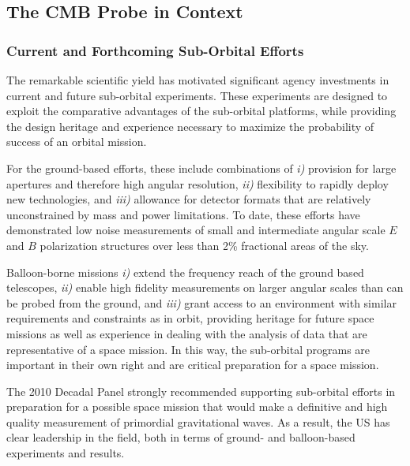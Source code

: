 
\subsection{The CMB Probe in Context}
\label{sec:spacemission}

\vspace{-0.05in}

\subsubsection{Current and Forthcoming Sub-Orbital Efforts}

The remarkable scientific yield has motivated significant agency investments 
in current and future sub-orbital experiments. 
These experiments are designed 
to exploit the comparative advantages of the sub-orbital platforms, while providing the design heritage and 
experience necessary to maximize the probability of success of an orbital mission. 

For the ground-based efforts, these include combinations of {\it i)}
provision for large apertures and therefore high angular
resolution, {\it ii)} flexibility to rapidly deploy new technologies, and {\it iii)}
allowance for detector formats that are relatively unconstrained by
mass and power limitations.  To date, these efforts have demonstrated low
noise measurements of small and intermediate angular scale $E$ and $B$ polarization 
structures over less than 2\% fractional areas of the sky. 

Balloon-borne missions {\it i)} extend the frequency reach of the ground based telescopes, 
{\it ii)} enable high fidelity measurements on larger angular scales than can be probed from the 
ground, and {\it iii)} grant access to an environment with similar requirements and constraints
as in orbit, providing heritage for future space missions as well as experience in dealing with the 
analysis of data that are representative of a space mission. In this way, the sub-orbital programs are 
important in their own right and are critical preparation for a space mission.

The 2010 Decadal Panel strongly recommended supporting sub-orbital efforts in preparation 
for a possible space mission that would make a definitive and high quality measurement of primordial 
gravitational waves. 
As a result, the US has clear leadership in the field, both in terms of ground- and balloon-based 
experiments and results. 

